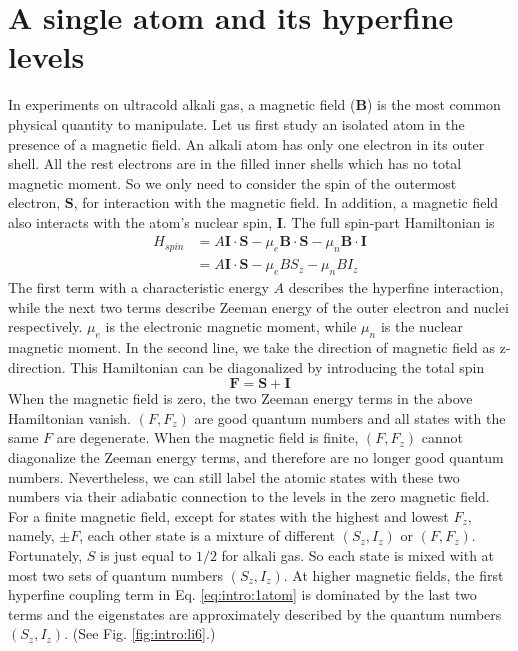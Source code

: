 \section{A single atom and its hyperfine levels}
In experiments on ultracold alkali gas, a magnetic field ($\mathbf{B}$) is the most common physical quantity to manipulate.   Let us first study an   isolated atom in the presence of a magnetic field.  An alkali atom has only one electron in its outer shell.  All the rest electrons are in the filled inner shells which  has no total magnetic moment.  So we only need to consider the spin of the outermost electron,  $\mathbf{S}$, for interaction with the magnetic field. In addition, a magnetic field also interacts with the atom's nuclear spin, $\mathbf{I}$.  The full spin-part Hamiltonian is
\begin{equation}
\begin{split}\label{eq:intro:1atom}
H_{spin}&=A \mathbf{I}\cdot\mathbf{S}-\mu_{e}\mathbf{B}\cdot\mathbf{S}-{\mu}_{n}\mathbf{B}\cdot\mathbf{I}\\
&=A \mathbf{I}\cdot\mathbf{S}-\mu_{e}{B}{S_{z}}-{\mu}_{n}{B}{I_{z}}
\end{split}
\end{equation}
The first term with a characteristic energy $A$ describes the hyperfine interaction, while the next two terms describe Zeeman energy of the outer electron and nuclei respectively. $\mu_{e}$ is the electronic magnetic moment, while $\mu_n$ is the nuclear magnetic moment.  In the second line, we take the direction of magnetic field as z-direction. This Hamiltonian can be diagonalized by introducing the total spin 
\begin{equation}
\mathbf{F}=\mathbf{S}+\mathbf{I}
\end{equation}
When the magnetic field is zero, the two Zeeman energy terms in the above Hamiltonian vanish.  $(F,F_{z})$ are good quantum numbers and all states with the same $F$ are degenerate.   When the magnetic field is finite, $(F,F_{z})$ cannot diagonalize the Zeeman energy terms, and therefore are no longer good quantum numbers. Nevertheless, we can still label the atomic  states with these two numbers via their adiabatic connection to the levels in the zero magnetic field.  For a finite magnetic field, except for states with the highest and lowest $F_{z}$, namely, $\pm{}F$, each other state is a mixture of different $(S_{z}, I_{z})$ or $(F,F_z)$.  Fortunately, $S$ is just equal to $1/2$ for alkali gas. So each state is mixed with at most  two sets of quantum numbers $(S_{z}, I_{z})$. At higher magnetic fields, the first hyperfine coupling term in Eq. \eqref{eq:intro:1atom} is dominated by the last two terms and the eigenstates are approximately described by the quantum numbers $(S_{z},I_{z})$.  (See Fig. \ref{fig:intro:li6}.)

